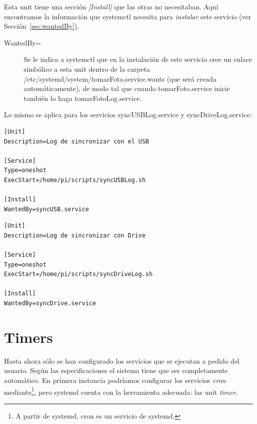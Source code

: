 \documentclass[10pt,a4paper]{article}
\newenvironment{unitFrame}[1][]{%
    \begin{mdframed}[%
        frametitle={#1},
        skipabove=\baselineskip plus 2pt minus 1pt,
        skipbelow=\baselineskip plus 2pt minus 1pt,
        linewidth=0.5pt,
        frametitlerule=true,
        frametitlebackgroundcolor=gray!10
    ]%
}{%
    \end{mdframed}
}
\begin{document}
Esta unit tiene una secci\'on \emph{[Install]} que las otras no necesitaban. Aqu\'i encontramos la informaci\'on que systemctl necesita para \emph{instalar} este servicio (ver Secci\'on~\ref{sec:wantedBy}).

\begin{description}
    \item [WantedBy=] Se le indica a systemctl que en la instalaci\'on de este servicio cree un enlace simb\'olico a esta unit dentro de la carpeta /etc/systemd/system/tomarFoto.service.wants (que ser\'a creada autom\'aticamente), de modo tal que cuando tomarFoto.service inicie tambi\'en lo haga tomarFotoLog.service.
\end{description}

Lo mismo se aplica para los servicios syncUSBLog.service y syncDriveLog.service:

\begin{scriptsize}
\begin{unitFrame}[/etc/systemd/system/syncUSBLog.service]
\begin{verbatim}
[Unit]
Description=Log de sincronizar con el USB

[Service]
Type=oneshot
ExecStart=/home/pi/scripts/syncUSBLog.sh

[Install]
WantedBy=syncUSB.service
\end{verbatim}
\end{unitFrame}
\end{scriptsize}

\begin{scriptsize}
\begin{unitFrame}[/etc/systemd/system/syncDriveLog.service]
\begin{verbatim}
[Unit]
Description=Log de sincronizar con Drive

[Service]
Type=oneshot
ExecStart=/home/pi/scripts/syncDriveLog.sh

[Install]
WantedBy=syncDrive.service
\end{verbatim}
\end{unitFrame}
\end{scriptsize}

\section{Timers}

Hasta ahora s\'olo se han configurado los servicios que se ejecutan a pedido del usuario. Seg\'un las especificaciones el sistema tiene que ser completamente autom\'atico. En primera instancia podr\'iamos configurar los servicios \emph{cron} mediante\footnote{A partir de systemd, cron es un servicio de systemd.}, pero systemd cuenta con la herramienta adecuada: las unit \emph{timer}.\\
\end{document}

